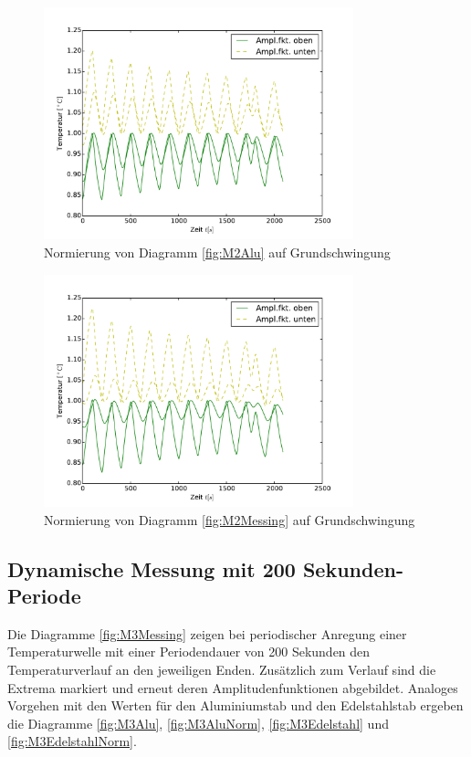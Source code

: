 \begin{figure}[htp]
	\label{fig:M2MessingNorm}
	\centering
	\includegraphics[width=0.8\textwidth]{Bilder/Normierungsauswahl/M2_Alu_norm.pdf}
	\caption{Normierung von Diagramm \ref{fig:M2Alu} auf Grundschwingung}
\end{figure}
\begin{figure}[htp]
	\label{fig:M2AluNorm}
	\centering
	\includegraphics[width=0.8\textwidth]{Bilder/Normierungsauswahl/M2_Messing_norm.pdf}
	\caption{Normierung von Diagramm \ref{fig:M2Messing} auf Grundschwingung}
\end{figure}
\subsection{Dynamische Messung mit 200 Sekunden-Periode}
Die Diagramme \ref{fig:M3Messing} zeigen bei periodischer Anregung einer Temperaturwelle mit einer Periodendauer von 200 Sekunden den Temperaturverlauf an den jeweiligen Enden. 
Zusätzlich zum Verlauf sind die Extrema markiert und erneut deren Amplitudenfunktionen abgebildet.
Analoges Vorgehen mit den Werten für den Aluminiumstab und den Edelstahlstab ergeben die Diagramme \ref{fig:M3Alu}, \ref{fig:M3AluNorm}, \ref{fig:M3Edelstahl} und \ref{fig:M3EdelstahlNorm}.

